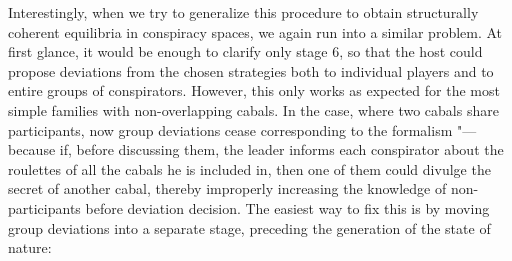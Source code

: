 Interestingly, when we try to generalize this procedure to obtain structurally coherent equilibria in conspiracy spaces, we again run into a similar problem. At first glance, it would be enough to clarify only stage 6, so that the host could propose deviations from the chosen strategies both to individual players and to entire groups of conspirators. However, this only works as expected for the most simple families with non-overlapping cabals. In the case, where two cabals share participants, now group deviations cease corresponding to the formalism "--- because if, before discussing them, the leader informs each conspirator about the roulettes of all the cabals he is included in, then one of them could divulge the secret of another cabal, thereby improperly increasing the knowledge of non-participants before deviation decision. The easiest way to fix this is by moving group deviations into a separate stage, preceding the generation of the state of nature: %

